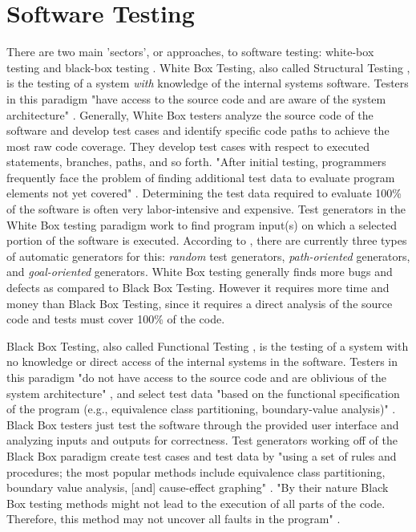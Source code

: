\documentclass[10pt, final, journal, letterpaper, twoside, twocolumn]{IEEEtran}
\begin{document}
\section{Software Testing}
	There are two main 'sectors', or approaches, to software testing: white-box testing and black-box testing \cite{boxes}. White Box Testing, also called Structural Testing \cite{slide-testing}, is the testing of a system \textit{with} knowledge of the internal systems software. Testers in this paradigm "have access to the source code and are aware of the system architecture" \cite{boxes}. Generally, White Box testers analyze the source code of the software and develop test cases and identify specific code paths to achieve the most raw code coverage. They develop test cases with respect to executed statements, branches, paths, and so forth. "After initial testing, programmers frequently face the problem of finding additional test data to evaluate program elements not yet covered" \cite{assertion}. Determining the test data required to evaluate 100\% of the software is often very labor-intensive and expensive. Test generators in the White Box testing paradigm work to find program input(s) on which a selected portion of the software is executed. According to \cite{assertion}, there are currently three types of automatic generators for this: \textit{random} test generators, \textit{path-oriented} generators, and \textit{goal-oriented} generators. White Box testing generally finds more bugs and defects as compared to Black Box Testing. However it requires more time and money than Black Box Testing, since it requires a direct analysis of the source code and tests must cover 100\% of the code.
	
	Black Box Testing, also called Functional Testing \cite{slide-testing}, is the testing of a system with no knowledge or direct access of the internal systems in the software. Testers in this paradigm "do not have access to the source code and are oblivious of the system architecture" \cite{boxes}, and select test data "based on the functional specification of the program (e.g., equivalence class partitioning, boundary-value analysis)" \cite{assertion}. Black Box testers just test the software through the provided user interface and analyzing inputs and outputs for correctness. Test generators working off of the Black Box paradigm create test cases and test data by "using a set of rules and procedures; the most popular methods include equivalence class partitioning, boundary value analysis, [and] cause-effect graphing" \cite{assertion}. "By their nature Black Box testing methods might not lead to the execution of all parts of the code. Therefore, this method may not uncover all faults in the program" \cite{fuzzy-logic}.
	
\end{document}
